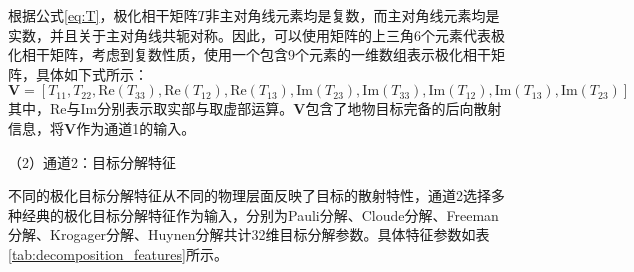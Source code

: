 根据公式\ref{eq:T}，极化相干矩阵$T$非主对角线元素均是复数，而主对角线元素均是实数，并且关于主对角线共轭对称。因此，可以使用矩阵的上三角6个元素代表极化相干矩阵，考虑到复数性质，使用一个包含9个元素的一维数组表示极化相干矩阵，具体如下式所示：
\begin{equation}
    \mathbf{V}=[T_{11}, T_{22}, \text{Re}(T_{33}), \text{Re}(T_{12}), \text{Re}(T_{13}), \text{Im}(T_{23}), \text{Im}(T_{33}), \text{Im}(T_{12}), \text{Im}(T_{13}), \text{Im}(T_{23})]
\end{equation}
其中，$\text{Re}$与$\text{Im}$分别表示取实部与取虚部运算。$\mathbf{V}$包含了地物目标完备的后向散射信息，将$\mathbf{V}$作为通道1的输入。

（2）通道2：目标分解特征

不同的极化目标分解特征从不同的物理层面反映了目标的散射特性，通道2选择多种经典的极化目标分解特征作为输入，分别为Pauli分解、Cloude分解、Freeman分解、Krogager分解、Huynen分解共计32维目标分解参数。具体特征参数如表\ref{tab:decomposition_features}所示。

